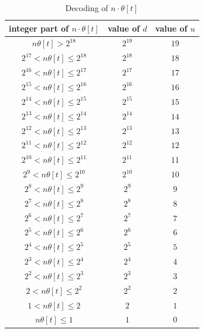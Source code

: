 \documentclass[10pt,journal,compsoc]{IEEEtran}
\begin{document}
\begin{table}[!htb]\centering
\renewcommand{\arraystretch}{1.2}
\caption{Decoding of $n\cdot\theta[t]$}\label{tab:decode_ntheta}
\begin{minipage}{.48\textwidth}\centering
\begin{tabular}{ccc}
\hline
     integer part of $n\cdot\theta[t]$          & value of $d$  & value of $u$\\
\hline
 $n\theta[t] > 2^{18}$  &  $2^{19}$ & $19$\\
 \hline
 $ 2^{17}< n\theta[t] \leq 2^{18}$  &  $2^{18}$ & $18$\\
 $ 2^{16}< n\theta[t] \leq 2^{17}$  &  $2^{17}$ & $17$\\
 $ 2^{15}< n\theta[t] \leq 2^{16}$  &  $2^{16}$ & $16$\\
 $ 2^{14}< n\theta[t] \leq 2^{15}$  &  $2^{15}$ & $15$\\
 $ 2^{13}< n\theta[t] \leq 2^{14}$  &  $2^{14}$ & $14$\\
 $ 2^{12}< n\theta[t] \leq 2^{13}$  &  $2^{13}$ & $13$\\
 $ 2^{11}< n\theta[t] \leq 2^{12}$  &  $2^{12}$ & $12$\\
 $ 2^{10}< n\theta[t] \leq 2^{11}$  &  $2^{11}$ & $11$\\
 $ 2^{9}< n\theta[t] \leq 2^{10}$  &  $2^{10}$ & $10$\\
 $ 2^{8}< n\theta[t] \leq 2^{9}$  &  $2^{9}$ & $9$\\
 $ 2^{7}< n\theta[t] \leq 2^{8}$  &  $2^{8}$ & $8$\\
 $ 2^{6}< n\theta[t] \leq 2^{7}$  &  $2^{7}$ & $7$\\
 $ 2^{5}< n\theta[t] \leq 2^{6}$  &  $2^{6}$ & $6$\\
 $ 2^{4}< n\theta[t] \leq 2^{5}$  &  $2^{5}$ & $5$\\
 $ 2^{3}< n\theta[t] \leq 2^{4}$  &  $2^{4}$ & $4$\\
 $ 2^{2}< n\theta[t] \leq 2^{3}$  &  $2^{3}$ & $3$\\
 $ 2< n\theta[t] \leq 2^{2}$  &  $2^{2}$ & $2$\\
 $ 1< n\theta[t] \leq 2$  &  $2$ & $1$\\
 \hline
 $ n\theta[t] \leq 1$  &  $1$ & $0$\\
\hline
\end{tabular}
\end{minipage}
\end{table}
\end{document}
